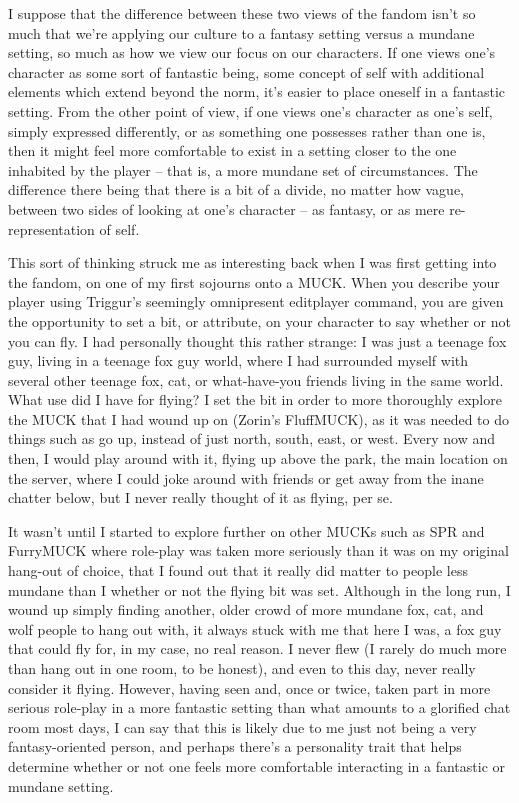 I suppose that the difference between these two views of the fandom isn't so much that we're applying our culture to a fantasy setting versus a mundane setting, so much as how we view our focus on our characters.  If one views one's character as some sort of fantastic being, some concept of self with additional elements which extend beyond the norm, it's easier to place oneself in a fantastic setting.  From the other point of view, if one views one's character as one's self, simply expressed differently, or as something one possesses rather than one is, then it might feel more comfortable to exist in a setting closer to the one inhabited by the player -- that is, a more mundane set of circumstances.  The difference there being that there is a bit of a divide, no matter how vague, between two sides of looking at one's character -- as fantasy, or as mere re-representation of self.

This sort of thinking struck me as interesting back when I was first getting into the fandom, on one of my first sojourns onto a MUCK.  When you describe your player using Triggur's seemingly omnipresent editplayer command, you are given the opportunity to set a bit, or attribute, on your character to say whether or not you can fly.  I had personally thought this rather strange: I was just a teenage fox guy, living in a teenage fox guy world, where I had surrounded myself with several other teenage fox, cat, or what-have-you friends living in the same world.  What use did I have for flying?  I set the bit in order to more thoroughly explore the MUCK that I had wound up on (Zorin's FluffMUCK), as it was needed to do things such as go up, instead of just north, south, east, or west.  Every now and then, I would play around with it, flying up above the park, the main location on the server, where I could joke around with friends or get away from the inane chatter below, but I never really thought of it as flying, per se.

It wasn't until I started to explore further on other MUCKs such as SPR and FurryMUCK where role-play was taken more seriously than it was on my original hang-out of choice, that I found out that it really did matter to people less mundane than I whether or not the flying bit was set.  Although in the long run, I wound up simply finding another, older crowd of more mundane fox, cat, and wolf people to hang out with, it always stuck with me that here I was, a fox guy that could fly for, in my case, no real reason.  I never flew (I rarely do much more than hang out in one room, to be honest), and even to this day, never really consider it flying.  However, having seen and, once or twice, taken part in more serious role-play in a more fantastic setting than what amounts to a glorified chat room most days, I can say that this is likely due to me just not being a very fantasy-oriented person, and perhaps there's a personality trait that helps determine whether or not one feels more comfortable interacting in a fantastic or mundane setting.

